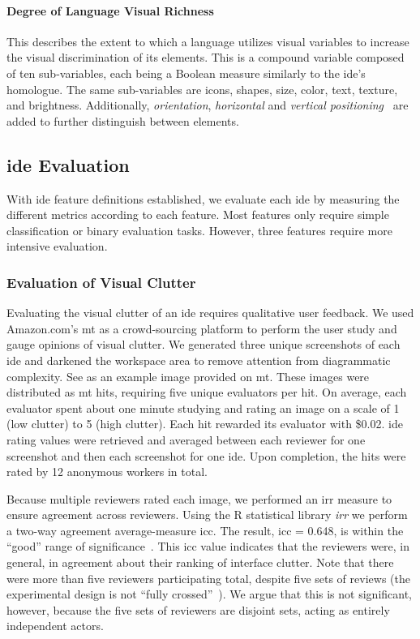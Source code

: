 \paragraph{Degree of Language Visual Richness}
This describes the extent to which a language utilizes visual variables to increase the visual discrimination of its elements.
This is a compound variable composed of ten sub-variables, each being a Boolean measure similarly to the \ac{ide}'s homologue.
The same sub-variables are icons, shapes, size, color, text, texture, and brightness.
Additionally, \emph{orientation}, \emph{horizontal} and \emph{vertical positioning}~\cite{moody2009} are added to further distinguish between elements.


\subsection{\acs{ide} Evaluation} \label{subsec:ideevaluation}

With \ac{ide} feature definitions established, we evaluate each \ac{ide} by measuring the different metrics according to each feature.
Most features only require simple classification or binary evaluation tasks.
However, three features require more intensive evaluation.


\subsubsection{Evaluation of Visual Clutter} \label{subsubsec:mturk}

Evaluating the visual clutter of an \ac{ide} requires qualitative user feedback.
We used Amazon.com's \ac{mt} as a crowd-sourcing platform to perform the user study and gauge opinions of visual clutter.
We generated three unique screenshots of each \ac{ide} and darkened the
workspace area to remove attention from diagrammatic complexity. See
 as an example image provided on \ac{mt}.
These images were distributed as \ac{mt} \acp{hit}, requiring five unique evaluators per \ac{hit}.
On average, each evaluator spent about one minute studying and rating an image on a scale of 1 (low clutter) to 5 (high clutter).
Each \ac{hit} rewarded its evaluator with \$0.02.
\ac{ide} rating values were retrieved and averaged between each reviewer for one screenshot and then each screenshot for one \ac{ide}.
Upon completion, the \acp{hit} were rated by 12 anonymous workers in total.

Because multiple reviewers rated each image, we performed an \ac{irr} measure to ensure agreement across reviewers.
Using the R statistical library \textsl{irr} we perform a two-way agreement average-measure \ac{icc}.
The result, \ac{icc} = 0.648, is within the ``good'' range of significance~\cite{cicchetti1994,hallgren2012}.
This \ac{icc} value indicates that the reviewers were, in general, in agreement about their ranking of interface clutter.
Note that there were more than five reviewers participating total, despite five sets of reviews (\ie the experimental design is not ``fully crossed''~\cite{hallgren2012}).
We argue that this is not significant, however, because the five sets of reviewers are disjoint sets, acting as entirely independent actors.

